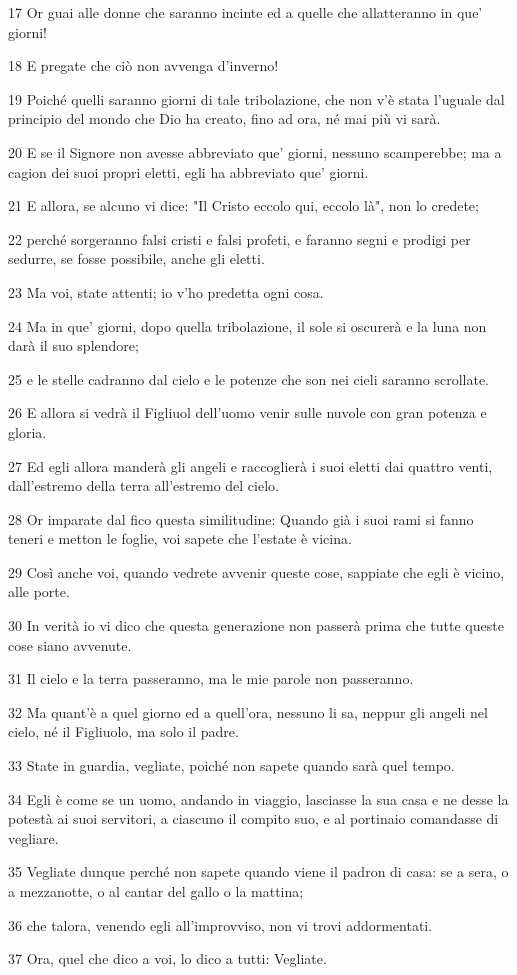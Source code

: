 \par 17 Or guai alle donne che saranno incinte ed a quelle che allatteranno in que' giorni!
\par 18 E pregate che ciò non avvenga d'inverno!
\par 19 Poiché quelli saranno giorni di tale tribolazione, che non v'è stata l'uguale dal principio del mondo che Dio ha creato, fino ad ora, né mai più vi sarà.
\par 20 E se il Signore non avesse abbreviato que' giorni, nessuno scamperebbe; ma a cagion dei suoi propri eletti, egli ha abbreviato que' giorni.
\par 21 E allora, se alcuno vi dice: "Il Cristo eccolo qui, eccolo là", non lo credete;
\par 22 perché sorgeranno falsi cristi e falsi profeti, e faranno segni e prodigi per sedurre, se fosse possibile, anche gli eletti.
\par 23 Ma voi, state attenti; io v'ho predetta ogni cosa.
\par 24 Ma in que' giorni, dopo quella tribolazione, il sole si oscurerà e la luna non darà il suo splendore;
\par 25 e le stelle cadranno dal cielo e le potenze che son nei cieli saranno scrollate.
\par 26 E allora si vedrà il Figliuol dell'uomo venir sulle nuvole con gran potenza e gloria.
\par 27 Ed egli allora manderà gli angeli e raccoglierà i suoi eletti dai quattro venti, dall'estremo della terra all'estremo del cielo.
\par 28 Or imparate dal fico questa similitudine: Quando già i suoi rami si fanno teneri e metton le foglie, voi sapete che l'estate è vicina.
\par 29 Così anche voi, quando vedrete avvenir queste cose, sappiate che egli è vicino, alle porte.
\par 30 In verità io vi dico che questa generazione non passerà prima che tutte queste cose siano avvenute.
\par 31 Il cielo e la terra passeranno, ma le mie parole non passeranno.
\par 32 Ma quant'è a quel giorno ed a quell'ora, nessuno li sa, neppur gli angeli nel cielo, né il Figliuolo, ma solo il padre.
\par 33 State in guardia, vegliate, poiché non sapete quando sarà quel tempo.
\par 34 Egli è come se un uomo, andando in viaggio, lasciasse la sua casa e ne desse la potestà ai suoi servitori, a ciascuno il compito suo, e al portinaio comandasse di vegliare.
\par 35 Vegliate dunque perché non sapete quando viene il padron di casa: se a sera, o a mezzanotte, o al cantar del gallo o la mattina;
\par 36 che talora, venendo egli all'improvviso, non vi trovi addormentati.
\par 37 Ora, quel che dico a voi, lo dico a tutti: Vegliate.

